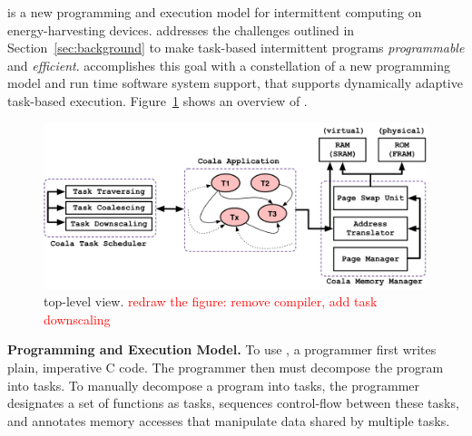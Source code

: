 \sys is a new programming and execution model for intermittent computing on energy-harvesting devices. \sys addresses the challenges outlined in Section~\ref{sec:background} to make task-based intermittent programs {\em programmable} and {\em efficient}. \sys accomplishes this goal with a constellation of a new programming model and run time software system support, that supports dynamically adaptive task-based execution. Figure~\ref{fig:system_overview} shows an overview of \sys.

\begin{figure}
	\centering
	\includegraphics[width=\columnwidth]{figures/graffle/overview.pdf}
	\caption{\sys top-level view. \textcolor{red}{redraw the figure: remove compiler, add task downscaling}}
	\label{fig:system_overview}
\end{figure}

\textbf{\sys Programming and Execution Model.}  To use \sys, a programmer first writes plain, imperative C code. The programmer
then must decompose the program into tasks. To manually decompose a program into tasks, the programmer designates a set of functions as tasks, sequences control-flow between these tasks, and annotates memory accesses that manipulate data shared by multiple tasks. 

%
%
%

